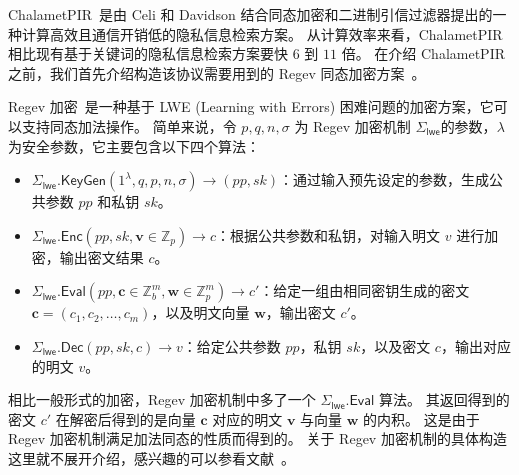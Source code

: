 ChalametPIR~\cite{celi2024call}是由 Celi 和 Davidson 结合同态加密和二进制引信过滤器提出的一种计算高效且通信开销低的隐私信息检索方案。
从计算效率来看，ChalametPIR 相比现有基于关键词的隐私信息检索方案要快 $6$ 到 $11$ 倍。
在介绍 ChalametPIR 之前，我们首先介绍构造该协议需要用到的 Regev 同态加密方案~\cite{regev2009lattices}。

Regev 加密~\cite{regev2009lattices}是一种基于 LWE (Learning with Errors) 困难问题的加密方案，它可以支持同态加法操作。
简单来说，令 $p, q, n, \sigma$ 为 Regev 加密机制 $\Sigma_{\mathsf{lwe}}$的参数，$\lambda$ 为安全参数，它主要包含以下四个算法：
\begin{itemize}
  \item $\Sigma_{\mathsf{lwe}}.\mathsf{KeyGen}(1^\lambda, q, p, n, \sigma) \to (pp, sk)$：通过输入预先设定的参数，生成公共参数 $pp$ 和私钥 $sk$。
  \item $\Sigma_{\mathsf{lwe}}.\mathsf{Enc}(pp, sk, \mathbf{v}\in \mathbb{Z}_p) \to c$：根据公共参数和私钥，对输入明文 $v$ 进行加密，输出密文结果 $c$。
  \item $\Sigma_{\mathsf{lwe}}.\mathsf{Eval}(pp, \mathbf{c} \in \mathbb{Z}_b^m, \mathbf{w} \in \mathbb{Z}_p^m)\to c'$：给定一组由相同密钥生成的密文 $\mathbf{c} = (c_1, c_2, \dots, c_m)$，以及明文向量 $\mathbf{w}$，输出密文 $c'$。
  \item $\Sigma_{\mathsf{lwe}}.\mathsf{Dec}(pp, sk, c) \to v$：给定公共参数 $pp$，私钥 $sk$，以及密文 $c$，输出对应的明文 $v$。
\end{itemize}

相比一般形式的加密，Regev 加密机制中多了一个 $\Sigma_{\mathsf{lwe}}.\mathsf{Eval}$ 算法。
其返回得到的密文 $c'$ 在解密后得到的是向量 $\mathbf{c}$ 对应的明文 $\mathbf{v}$  与向量 $\mathbf{w}$ 的内积。
这是由于 Regev 加密机制满足加法同态的性质而得到的。
关于 Regev 加密机制的具体构造这里就不展开介绍，感兴趣的可以参看文献~\cite{regev2009lattices}。

